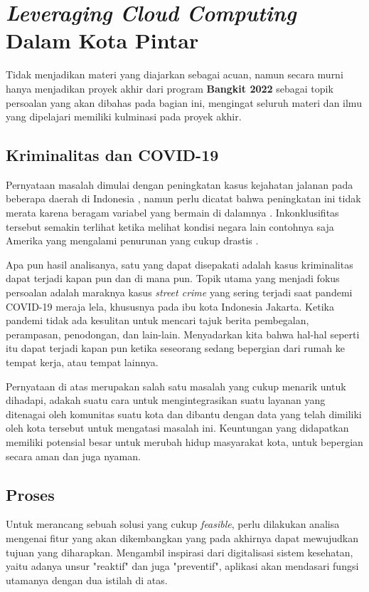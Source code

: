 \section{\textit{Leveraging Cloud Computing} Dalam Kota Pintar}

Tidak menjadikan materi yang diajarkan sebagai acuan, namun secara murni hanya menjadikan proyek akhir dari program \textbf{Bangkit 2022} sebagai topik persoalan yang akan dibahas pada bagian ini, mengingat seluruh materi dan ilmu yang dipelajari memiliki kulminasi pada proyek akhir.

\subsection{Kriminalitas dan COVID-19}

Pernyataan masalah dimulai dengan peningkatan kasus kejahatan jalanan pada beberapa daerah di Indonesia \citep{IncreaseCrimeUnoff}, namun perlu dicatat bahwa peningkatan ini tidak merata karena beragam variabel yang bermain di dalamnya \citep{indonesiaCrimeInconclusive}. Inkonklusifitas tersebut semakin terlihat ketika melihat kondisi negara lain contohnya saja Amerika yang mengalami penurunan yang cukup drastis \citep{CovidAndCrime}.

Apa pun hasil analisanya, satu yang dapat disepakati adalah kasus kriminalitas dapat terjadi kapan pun dan di mana pun. Topik utama yang menjadi fokus persoalan adalah maraknya kasus \textit{street crime} yang sering terjadi saat pandemi COVID-19 meraja lela, khususnya pada ibu kota Indonesia Jakarta. Ketika pandemi tidak ada kesulitan untuk mencari tajuk berita pembegalan, perampasan, penodongan, dan lain-lain. Menyadarkan kita bahwa hal-hal seperti itu dapat terjadi kapan pun ketika seseorang sedang bepergian dari rumah ke tempat kerja, atau tempat lainnya.

Pernyataan di atas merupakan salah satu masalah yang cukup menarik untuk dihadapi, adakah suatu cara untuk mengintegrasikan suatu layanan yang ditenagai oleh komunitas suatu kota dan dibantu dengan data yang telah dimiliki oleh kota tersebut untuk mengatasi masalah ini. Keuntungan yang didapatkan memiliki potensial besar untuk merubah hidup masyarakat kota, untuk bepergian secara aman dan juga nyaman.

\subsection{Proses}

Untuk merancang sebuah solusi yang cukup \textit{feasible}, perlu dilakukan analisa mengenai fitur yang akan dikembangkan yang pada akhirnya dapat mewujudkan tujuan yang diharapkan. Mengambil inspirasi dari digitalisasi sistem kesehatan, yaitu adanya unsur "reaktif" dan juga "preventif", aplikasi akan mendasari fungsi utamanya dengan dua istilah di atas.

